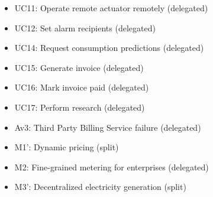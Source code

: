 \begin{itemize}
\begin{itemize}
	  	\item UC11: Operate remote actuator remotely (delegated)
	  	\item UC12: Set alarm recipients (delegated)
	  	\item UC14: Request consumption predictions (delegated)
	  	\item UC15: Generate invoice (delegated)
	  	\item UC16: Mark invoice paid (delegated)
	  	\item UC17: Perform research (delegated)
	  	\item Av3: Third Party Billing Service failure (delegated)
	  	\item M1': Dynamic pricing (split)
	  	\item M2: Fine-grained metering for enterprises (delegated)
	  	\item M3': Decentralized electricity generation (split)
	\end{itemize}
\end{itemize}
